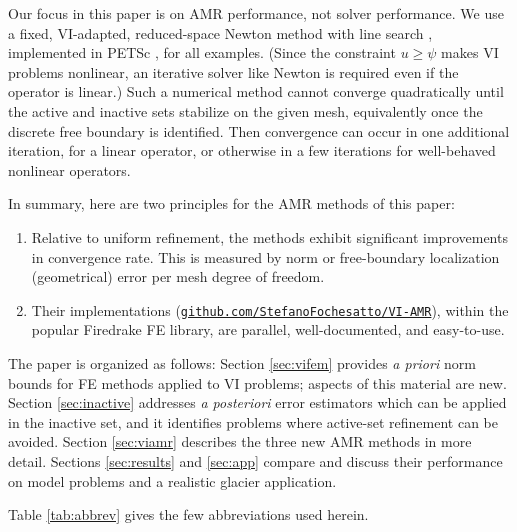 \documentclass[]{interact}
\theoremstyle{plain}%
\theoremstyle{definition}
\theoremstyle{remark}
\begin{document}
Our focus in this paper is on AMR performance, not solver performance.  We use a fixed, VI-adapted, reduced-space Newton method with line search \cite{BensonMunson2006}, implemented in PETSc \cite{petsc-user-ref}, for all examples.  (Since the constraint $u \geq \psi$ makes VI problems nonlinear, an iterative solver like Newton is required even if the operator is linear.)  Such a numerical method cannot converge quadratically until the active and inactive sets stabilize on the given mesh, equivalently once the discrete free boundary is identified.  Then convergence can occur in one additional iteration, for a linear operator, or otherwise in a few iterations for well-behaved nonlinear operators.

In summary, here are two principles for the AMR methods of this paper:
\renewcommand{\labelenumi}{\arabic{enumi}.}
\begin{enumerate}
\item Relative to uniform refinement, the methods exhibit significant improvements in convergence rate.  This is measured by norm or free-boundary localization (geometrical) error per mesh degree of freedom.
\item Their implementations (\href{https://github.com/StefanoFochesatto/VI-AMR}{{\small \texttt{github.com/StefanoFochesatto/VI-AMR}}}), within the popular Firedrake \cite{Langeetal2016} FE library, are parallel, well-documented, and easy-to-use.
\end{enumerate}

The paper is organized as follows:  Section \ref{sec:vifem} provides \emph{a priori} norm bounds for FE methods applied to VI problems; aspects of this material are new.  Section \ref{sec:inactive} addresses \emph{a posteriori} error estimators which can be applied in the inactive set, and it identifies problems where active-set refinement can be avoided.  Section \ref{sec:viamr} describes the three new AMR methods in more detail.  Sections \ref{sec:results} and \ref{sec:app} compare and discuss their performance on model problems and a realistic glacier application.

Table \ref{tab:abbrev} gives the few abbreviations used herein.
\end{document}
